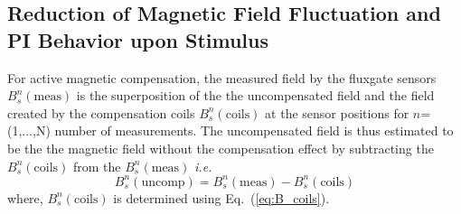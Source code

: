 
\subsection{Reduction of Magnetic Field Fluctuation and PI Behavior upon Stimulus}


For active magnetic compensation, the measured field by the fluxgate sensors $B_s^n(\text{meas})$ is the superposition of the the uncompensated field and the field created by the compensation coils $B_s^n(\text{coils})$ at the sensor positions for $n$=(1,...,N) number of measurements. The uncompensated field is thus estimated to be the the magnetic field without the compensation effect by subtracting the $B_s^n(\text{coils})$ from the $B_s^n(\text{meas})$ {\it i.e.}
\begin{equation}\label{eq:Buncomp}
     B_s^n(\text{uncomp})=B_s^n(\text{meas})- B_s^n(\text{coils})
\end{equation}
where, $B_s^n(\text{coils})$ is determined using Eq.~(\ref{eq:B_coils}).




